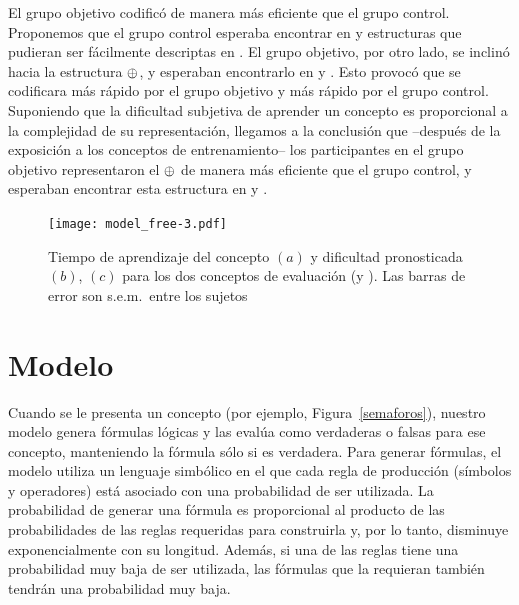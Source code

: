 El grupo objetivo codificó \testa de manera más eficiente que el grupo control. Proponemos que el grupo control esperaba encontrar en \testa y \testb estructuras que pudieran ser fácilmente descriptas en \grambool. El grupo objetivo, por otro lado, se inclinó hacia la estructura $\oplus$, y esperaban encontrarlo en \testa y \testb. Esto provocó que \testa se codificara más rápido por el grupo objetivo y \testb más rápido por el grupo control. Suponiendo que la dificultad subjetiva de aprender un concepto es proporcional a la complejidad de su representación, llegamos a la conclusión que --después de la exposición a los conceptos de entrenamiento-- los participantes en el grupo objetivo representaron el $\oplus$ de manera más eficiente que el grupo control, y esperaban encontrar esta estructura en \testa y \testb.



\begin{figure}[t!]
      \texttt{[image: model\_free-3.pdf]}
      \centering
      \caption{Tiempo de aprendizaje del concepto $(a)$ y dificultad pronosticada $(b)$, $(c)$ para los dos conceptos de evaluación (\testa y \testb). Las barras de error son s.e.m.\ entre los sujetos}
      \label{model free}
   \end{figure}
   
\section{Modelo}



Cuando se le presenta un concepto (por ejemplo, Figura~\ref{semaforos}), nuestro modelo genera fórmulas lógicas y las evalúa como verdaderas o falsas para ese concepto, manteniendo la fórmula sólo si es verdadera. Para generar fórmulas, el modelo utiliza un lenguaje simbólico en el que cada regla de producción (símbolos y operadores) está asociado con una probabilidad de ser utilizada. La probabilidad de generar una fórmula es proporcional al producto de las probabilidades de las reglas requeridas para construirla y, por lo tanto, disminuye exponencialmente con su longitud. Además, si una de las reglas tiene una probabilidad muy baja de ser utilizada, las fórmulas que la requieran también tendrán una probabilidad muy baja.



